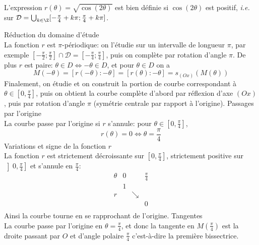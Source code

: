 {\begin{enumerate}
{\begin{center}
\end{center}
L'expression $r(\theta)=\sqrt{\cos(2\theta)}$ est bien définie si $\cos(2\theta)$ est positif, \textsl{i.e.} sur $\mathcal{D}=\bigcup_{k\in\Z}[-\frac{\pi}{4}+k\pi;\frac{\pi}{4}+k\pi]$.
\begin{itemize}
Réduction du domaine d'étude\\
La fonction $r$ est $\pi$-périodique: on l'étudie sur un intervalle de longueur $\pi$, par exemple $[-\frac{\pi}{2};\frac{\pi}{2}]\cap\mathcal{D}=[-\frac{\pi}{4};\frac{\pi}{4}]$, puis on complète par rotation d'angle $\pi$. De plus $r$ est paire: $\theta\in D\Leftrightarrow-\theta\in D$, et pour $\theta\in D$ on a
$$M(-\theta)=\left[r(-\theta):-\theta\right]=\left[r(\theta):-\theta\right]=s_{(Ox)}(M(\theta))$$
Finalement, on étudie et on construit la portion de courbe correspondant à $\theta\in[0,\frac{\pi}{4}]$, puis on obtient la courbe complète d'abord par réflexion d'axe $(Ox)$, puis par rotation d'angle $\pi$ (symétrie centrale par rapport à l'origine).
Passages par l'origine\\
La courbe passe par l'origine si $r$ s'annule: pour $\theta\in[0,\frac{\pi}{4}]$,
$$r(\theta)=0\Longleftrightarrow\theta=\frac{\pi}{4}$$
Variations et signe de la fonction $r$\\
La fonction $r$ est strictement décroissante sur $[0,\frac{\pi}{4}]$, strictement positive sur $\left]0,\frac{\pi}{4}\right]$ et s'annule en $\frac{\pi}{4}$:
$$\begin{array}{c|lcr}
\theta&0&\ &\frac{\pi}{4}\\\hline
\ &1 &\ & \\
r&\ &\searrow &\ \\
 & &\ &0 \\
\end{array}$$
Ainsi la courbe tourne en se rapprochant de l'origine.
Tangentes\\
La courbe passe par l'origine en $\theta=\frac{\pi}{4}$, et donc la tangente en $M\left(\frac{\pi}{4}\right)$ est la droite passant par $O$ et d'angle polaire $\frac{\pi}{4}$ c'est-à-dire la première bissectrice. 


\end{itemize}}
\end{enumerate}}
